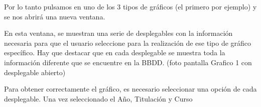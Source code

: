 Por lo tanto pulsamos en uno de los 3 tipos de gráficos (el primero por ejemplo) y se nos abrirá una nueva ventana.


En esta ventana, se muestran una serie de desplegables con la información necesaria para que el usuario seleccione para la realización de ese
 tipo de gráfico específico. Hay que destacar que en cada desplegable se muestra toda la información diferente que se encuentre en la BBDD.
(foto pantalla Grafico 1 con desplegable abierto)

Para obtener correctamente el gráfico, es necesario seleccionar una opción de cada desplegable.
Una vez seleccionado el Año, Titulación y Curso































